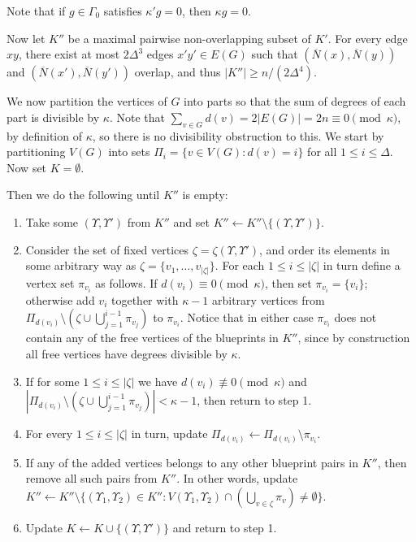 \documentclass{article}
\theoremstyle{definition}
\begin{document}
Note that if $g\in \Gamma_0$ satisfies $\kappa'g = 0$, then $\kappa g= 0$.

Now let $K''$ be a maximal pairwise non-overlapping subset of $K'$. For every edge $xy$, there exist at most $2\Delta^3$ edges $x'y'\in E(G)$ such that $(\overline{N}(x),\overline{N}(y))$ and $(\overline{N}(x'), \overline{N}(y'))$ overlap, and thus $|K''|\geq n/(2\Delta^4)$.

We now partition the vertices of $G$ into parts so that the sum of degrees of each part is divisible by $\kappa$. Note that $\sum_{v\in G}d(v) = 2|E(G)|=2n \equiv 0 \pmod \kappa$, by definition of $\kappa$, so there is no divisibility obstruction to this. We start by partitioning $V(G)$ into sets $\Pi_i=\{v\in V(G):d(v)=i\}$ for all $1\leq i\leq \Delta$. Now set $K=\emptyset$. 

Then we do the following until $K''$ is empty:
\begin{enumerate}\label{def:K}
    \item Take some 
$(\Upsilon,\Upsilon')$ from $K''$ and set $K''\gets K''\setminus \{(\Upsilon,\Upsilon')\}$. \label{K_1first}
\item Consider the set of fixed vertices $\zeta=\zeta(\Upsilon,\Upsilon')$, and order its elements in some arbitrary way as $\zeta=\{v_1, \dots, v_{|\zeta|} \}$. For each $1\leq i\leq |\zeta|$ in turn define a vertex set $\pi_{v_i}$ as follows. If $d(v_i) \equiv  0 \pmod \kappa$, then set $\pi_{v_i}=\{v_i\}$; otherwise add $v_i$ together with $\kappa-1$ arbitrary vertices from $\Pi_{d(v_i)}\setminus \left(\zeta\cup \bigcup_{j=1}^{i-1}\pi_{v_j} \right)$ to $\pi_{v_i}$. Notice that in either case $\pi_{v_i}$ does not contain any of the free vertices of the blueprints in $K''$, since by construction all free vertices have degrees divisible by $\kappa$.
\item If for some $1\leq i\leq |\zeta|$ we have $d(v_i)\not\equiv 0 \pmod \kappa$ and $\left|\Pi_{d(v_i)}\setminus\left(\zeta\cup\bigcup_{j=1}^{i-1}\pi_{v_j}\right)\right|<\kappa-1$, then return to step 1. \label{K_13}
\item For every $1\leq i\leq |\zeta|$ in turn, update $\Pi_{d(v_i)}\gets \Pi_{d(v_i)}\setminus\pi_{v_i}$.
\item If any of the added vertices belongs to any other blueprint pairs in $K''$, then remove all such pairs from $K''$. In other words, update $K''\gets K''\setminus \{(\Upsilon_1,\Upsilon_2)\in K'':V(\Upsilon_1,\Upsilon_2)\cap \left(\bigcup_{v\in \zeta}\pi_v\right)\neq \emptyset\}$. \label{K_15}
\item Update $K\gets K\cup \{(\Upsilon,\Upsilon')\}$ and return to step 1.
\end{enumerate}
\end{document}
